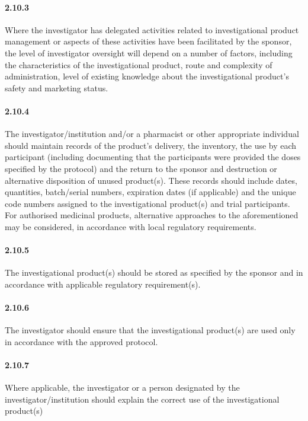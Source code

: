 \documentclass[11pt]{article}
\begin{document}
\paragraph{2.10.3} Where the investigator has delegated activities related to investigational product management or aspects of these activities have been facilitated by the sponsor, the level of investigator oversight will depend on a number of factors, including the characteristics of the investigational product, route and complexity of administration, level of existing knowledge about the investigational product's safety and marketing status.

\paragraph{2.10.4} The investigator/institution and/or a pharmacist or other appropriate individual should maintain records of the product's delivery, the inventory, the use by each participant (including documenting that the participants were provided the doses specified by the protocol) and the return to the sponsor and destruction or alternative disposition of unused product(s). These records should include dates, quantities, batch/serial numbers, expiration dates (if applicable) and the unique code numbers assigned to the investigational product(s) and trial participants. For authorised medicinal products, alternative approaches to the aforementioned may be considered, in accordance with local regulatory requirements.

\paragraph{2.10.5} The investigational product(s) should be stored as specified by the sponsor and in accordance with applicable regulatory requirement(s).

\paragraph{2.10.6} The investigator should ensure that the investigational product(s) are used only in accordance with the approved protocol.

\paragraph{2.10.7} Where applicable, the investigator or a person designated by the investigator/institution should explain the correct use of the investigational product(s)
\end{document}
